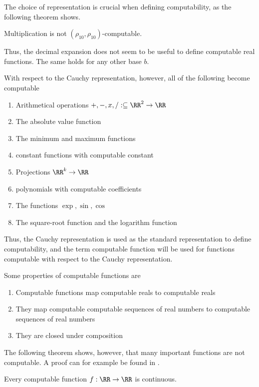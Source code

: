 The choice of representation is crucial when defining computability, as the
following theorem shows.
\begin{theorem}
Multiplication is not $(\rho_{10}, \rho_{10})$-computable.
\end{theorem}
Thus, the decimal expansion does not seem to be useful to define computable
real functions.
The same holds for any other base $b$.

With respect to the Cauchy representation, however, all of the following become
computable
\begin{enumerate}
\item Arithmetical operations $+,-,x,/ : \subseteq \RR^2 \to \RR$
\item The absolute value function
\item The minimum and maximum functions
\item constant functions with computable constant
\item Projections $\RR^k \to \RR$ 
\item polynomials with computable coefficients
\item The functions $\exp, \sin, \cos$
\item The square-root function and the logarithm function
\end{enumerate}
Thus, the Cauchy representation is used as the standard representation to
define computability, and the term computable function will be used for
functions computable with respect to the Cauchy representation.

Some  properties of computable functions are
\begin{enumerate}
  \item Computable functions map computable reals to computable reals
  \item They map computable computable sequences of real numbers to computable
    sequences of real numbers
  \item They are closed under composition
\end{enumerate}

The following theorem shows, however, that many important functions are not computable. 
A proof can for example be found in \cite{Wei}.
\begin{theorem}
  Every computable function $f: \RR \to \RR$ is continuous.
\end{theorem}

